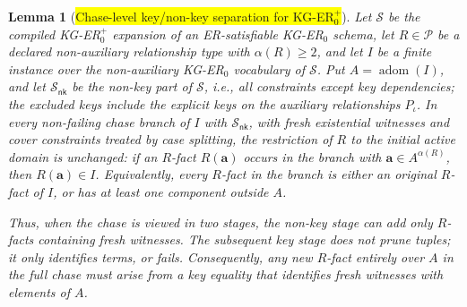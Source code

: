 \documentclass[10pt]{article}
\newtheorem{lemma}{Lemma}
\begin{document}
\begin{lemma}[\colorbox{yellow}{Chase-level key/non-key separation for KG-ER\(_0^+\)}]
\label{lem:kger-key-nonkey-separation}
Let \(\mathcal S\) be the compiled KG-ER\(_0^+\) expansion of an
ER-satisfiable KG-ER\(_0\) schema, let \(R\in\mathcal P\) be a declared
non-auxiliary relationship type with \(\alpha(R)\geq 2\), and let \(I\)
be a finite instance over the non-auxiliary KG-ER\(_0\) vocabulary of
\(\mathcal S\).  Put
\(A=\operatorname{adom}(I)\), and let
\(\mathcal S_{\mathsf{nk}}\) be the non-key part of \(\mathcal S\), i.e.,
all constraints except key dependencies; the excluded keys include the
explicit keys on the auxiliary relationships \(P_\iota\).
In every non-failing chase branch of \(I\) with
\(\mathcal S_{\mathsf{nk}}\), with fresh existential witnesses and cover
constraints treated by case splitting, the restriction of \(R\) to the
initial active domain is unchanged: if an \(R\)-fact
\(R(\mathbf a)\) occurs in the branch with
\(\mathbf a\in A^{\alpha(R)}\), then \(R(\mathbf a)\in I\).
Equivalently, every \(R\)-fact in the branch is either an original
\(R\)-fact of \(I\), or has at least one component outside \(A\).

Thus, when the chase is viewed in two stages, the non-key stage can add
only \(R\)-facts containing fresh witnesses.  The subsequent key stage
does not prune tuples; it only identifies terms, or fails.  Consequently,
any new \(R\)-fact entirely over \(A\) in the full chase must arise from
a key equality that identifies fresh witnesses with elements of \(A\).
\end{lemma}
\end{document}
